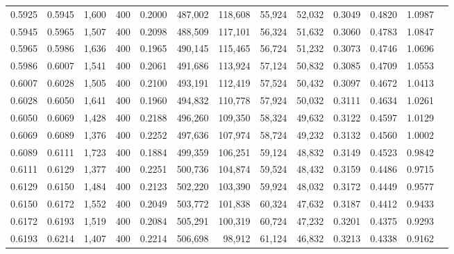 \begin{tabular}{rrrrrrrrrrrrr}
0.5925 & 0.5945 &  1,600 & 400 &                                     0.2000 & 487,002 & 118,608 &  55,924 &  52,032 & 0.3049 & 0.4820 & 1.0987 \\
0.5945 & 0.5965 &  1,507 & 400 &                                     0.2098 & 488,509 & 117,101 &  56,324 &  51,632 & 0.3060 & 0.4783 & 1.0847 \\
0.5965 & 0.5986 &  1,636 & 400 &                                     0.1965 & 490,145 & 115,465 &  56,724 &  51,232 & 0.3073 & 0.4746 & 1.0696 \\
0.5986 & 0.6007 &  1,541 & 400 &                                     0.2061 & 491,686 & 113,924 &  57,124 &  50,832 & 0.3085 & 0.4709 & 1.0553 \\
0.6007 & 0.6028 &  1,505 & 400 &                                     0.2100 & 493,191 & 112,419 &  57,524 &  50,432 & 0.3097 & 0.4672 & 1.0413 \\
0.6028 & 0.6050 &  1,641 & 400 &                                     0.1960 & 494,832 & 110,778 &  57,924 &  50,032 & 0.3111 & 0.4634 & 1.0261 \\
0.6050 & 0.6069 &  1,428 & 400 &                                     0.2188 & 496,260 & 109,350 &  58,324 &  49,632 & 0.3122 & 0.4597 & 1.0129 \\
0.6069 & 0.6089 &  1,376 & 400 &                                     0.2252 & 497,636 & 107,974 &  58,724 &  49,232 & 0.3132 & 0.4560 & 1.0002 \\
0.6089 & 0.6111 &  1,723 & 400 &                                     0.1884 & 499,359 & 106,251 &  59,124 &  48,832 & 0.3149 & 0.4523 & 0.9842 \\
0.6111 & 0.6129 &  1,377 & 400 &                                     0.2251 & 500,736 & 104,874 &  59,524 &  48,432 & 0.3159 & 0.4486 & 0.9715 \\
0.6129 & 0.6150 &  1,484 & 400 &                                     0.2123 & 502,220 & 103,390 &  59,924 &  48,032 & 0.3172 & 0.4449 & 0.9577 \\
0.6150 & 0.6172 &  1,552 & 400 &                                     0.2049 & 503,772 & 101,838 &  60,324 &  47,632 & 0.3187 & 0.4412 & 0.9433 \\
0.6172 & 0.6193 &  1,519 & 400 &                                     0.2084 & 505,291 & 100,319 &  60,724 &  47,232 & 0.3201 & 0.4375 & 0.9293 \\
0.6193 & 0.6214 &  1,407 & 400 &                                     0.2214 & 506,698 &  98,912 &  61,124 &  46,832 & 0.3213 & 0.4338 & 0.9162 \\

\end{tabular}
